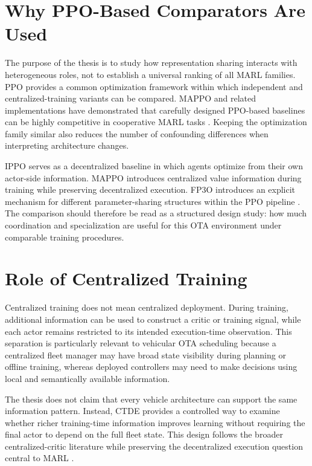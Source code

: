 \documentclass{iutbscthesis}
\begin{document}
\begin{appendices}
\section{Why PPO-Based Comparators Are Used}
The purpose of the thesis is to study how representation sharing interacts with heterogeneous roles, not to establish a universal ranking of all MARL families. PPO provides a common optimization framework within which independent and centralized-training variants can be compared. MAPPO and related implementations have demonstrated that carefully designed PPO-based baselines can be highly competitive in cooperative MARL tasks \parencite{yu2022surprising}. Keeping the optimization family similar also reduces the number of confounding differences when interpreting architecture changes.

IPPO serves as a decentralized baseline in which agents optimize from their own actor-side information. MAPPO introduces centralized value information during training while preserving decentralized execution. FP3O introduces an explicit mechanism for different parameter-sharing structures within the PPO pipeline \parencite{feng2023fp3o}. The comparison should therefore be read as a structured design study: how much coordination and specialization are useful for this OTA environment under comparable training procedures.

\section{Role of Centralized Training}
Centralized training does not mean centralized deployment. During training, additional information can be used to construct a critic or training signal, while each actor remains restricted to its intended execution-time observation. This separation is particularly relevant to vehicular OTA scheduling because a centralized fleet manager may have broad state visibility during planning or offline training, whereas deployed controllers may need to make decisions using local and semantically available information.

The thesis does not claim that every vehicle architecture can support the same information pattern. Instead, CTDE provides a controlled way to examine whether richer training-time information improves learning without requiring the final actor to depend on the full fleet state. This design follows the broader centralized-critic literature while preserving the decentralized execution question central to MARL \parencite{lowe2017maddpg,foerster2018coma}.


\end{appendices}
\end{document}
